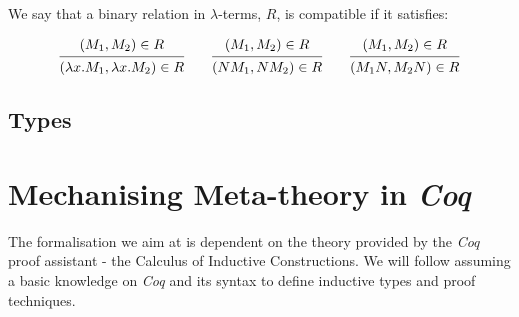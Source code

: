 \begin{definition}
  We say that a binary relation in $\lambda$-terms, $R$, is compatible if it satisfies:

  \[
    \begin{prooftree}
      \hypo{ (M_1, M_2) \in R }
      \infer1{ (\lambda x . M_1, \lambda x . M_2) \in R } 
    \end{prooftree}
    \qquad
    \begin{prooftree}
      \hypo{ (M_1, M_2) \in R }
      \infer1{ (N M_1, N M_2) \in R } 
    \end{prooftree}
    \qquad
    \begin{prooftree}
      \hypo{ (M_1, M_2) \in R }
      \infer1{ (M_1 N, M_2 N) \in R } 
    \end{prooftree}
  \] 
\end{definition}

\begin{definition}
\end{definition}

\begin{definition}
\end{definition}


\subsection{Types}

\cite{Barendregt2013}

\begin{definition}  
\end{definition}

\begin{definition}
\end{definition}


\section{Mechanising Meta-theory in \textit{Coq}}

The formalisation we aim at is dependent on the theory provided by the \textit{Coq} proof assistant - the Calculus of Inductive Constructions.
We will follow assuming a basic knowledge on \textit{Coq} and its syntax to define inductive types and proof techniques.

